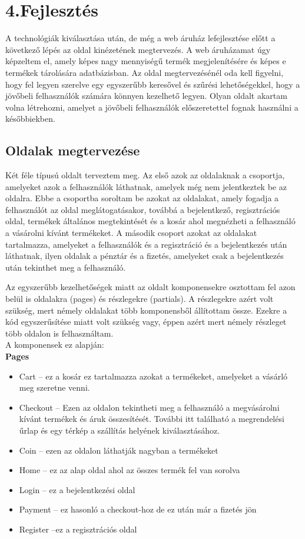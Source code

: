 \chapter{4.Fejlesztés}

A technológiák kiválasztása után, de még a web áruház lefejlesztése előtt a következő lépés az oldal kinézetének megtervezés. A web áruházamat úgy képzeltem el, amely képes nagy mennyiségű termék megjelenítésére és képes e termékek tárolására adatbázisban.  Az oldal megtervezésénél oda kell figyelni, hogy fel legyen szerelve egy egyszerűbb keresővel és szűrési lehetőségekkel, hogy a jövőbeli felhasználók számára könnyen kezelhető legyen. Olyan oldalt akartam volna létrehozni, amelyet a jövőbeli felhasználók előszeretettel fognak használni a későbbiekben.

\section{Oldalak megtervezése}

Két féle típusú oldalt terveztem meg. Az első azok az oldalaknak a csoportja, amelyeket azok a felhasználók láthatnak, amelyek még nem jelentkeztek be az oldalra. Ebbe a csoportba soroltam be azokat az oldalakat, amely fogadja a felhasználót az oldal meglátogatásakor, továbbá a bejelentkező, regisztrációs oldal, termékek általános megtekintését és a kosár ahol megnézheti a felhasználó a vásárolni kívánt termékeket. A második csoport azokat az oldalakat tartalmazza, amelyeket a felhasználók és a regisztráció és a bejelentkezés után láthatnak, ilyen oldalak a pénztár és a fizetés, amelyeket csak a bejelentkezés után tekinthet meg a felhasználó.

Az egyszerűbb kezelhetőségek miatt az oldalt komponensekre osztottam fel azon belül is oldalakra (pages) és részlegekre (partials). A részlegekre azért volt szükség, mert némely oldalakat több komponensből állítottam össze. Ezekre a kód egyszerűsítése miatt volt szükség vagy, éppen azért mert némely részleget több oldalon is felhasználtam.\\

A komponensek ez alapján:\\

\textbf{Pages}
\begin{itemize}
    \item Cart – ez a kosár ez tartalmazza azokat a termékeket, amelyeket a vásárló meg szeretne venni.
    \item Checkout – Ezen az oldalon tekintheti meg a felhasználó a megvásárolni kívánt termékek és áruk összesítését. További itt található a megrendelési űrlap és egy térkép a szállítás helyének kiválasztásához.
    \item Coin – ezen az oldalon láthatják nagyban a termékeket
    \item Home – ez az alap oldal ahol az összes termék fel van sorolva
    \item Login – ez a bejelentkezési oldal
    \item Payment – ez hasonló a checkout-hoz de ez után már a fizetés jön
    \item Register –ez a regisztrációs oldal
\end{itemize}

